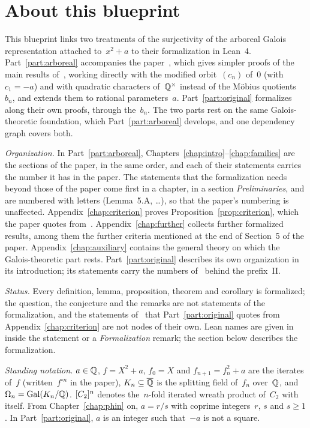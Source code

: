 \chapter*{About this blueprint}

This blueprint links two treatments of the surjectivity of the arboreal Galois representation
attached to~$x^2 + a$ to their formalization in Lean~4. Part~\ref{part:arboreal} accompanies the
paper~\cite{arboreal}, which gives simpler proofs of the main results
of~\cite{paper, li2020, li2021}, working directly with the modified orbit~$(c_n)$ of~$0$ (with
$c_1 = -a$) and with quadratic characters of~$\mathbb{Q}^\times$ instead of the Möbius quotients~$b_n$,
and extends them to rational parameters~$a$. Part~\ref{part:original} formalizes~\cite{paper, li2020, li2021} along
their own proofs, through the~$b_n$. The two parts rest on the same Galois-theoretic foundation,
which Part~\ref{part:arboreal} develops, and one dependency graph covers both.

\emph{Organization.} In Part~\ref{part:arboreal}, Chapters~\ref{chap:intro}--\ref{chap:families}
are the sections of the paper, in the same order, and each of their statements carries the number it has in the paper.
The statements that the formalization needs beyond those of the paper come first in a chapter,
in a section \emph{Preliminaries}, and are numbered with letters (Lemma~5.A, \dots), so that the
paper's numbering is unaffected. Appendix~\ref{chap:criterion} proves
Proposition~\ref{prop:criterion}, which the paper quotes from~\cite{paper}.
Appendix~\ref{chap:further} collects further formalized results, among them the further criteria
mentioned at the end of Section~5 of the paper. Appendix~\ref{chap:auxiliary} contains the
general theory on which the Galois-theoretic part rests. Part~\ref{part:original} describes its
own organization in its introduction; its statements carry the numbers of~\cite{paper} behind the
prefix~II.

\emph{Status.} Every definition, lemma, proposition, theorem and corollary is formalized; the
question, the conjecture and the remarks are not statements of the formalization, and the
statements of~\cite{paper} that Part~\ref{part:original} quotes from Appendix~\ref{chap:criterion}
are not nodes of their own. Lean names are
given in  inside the statement or a \emph{Formalization} remark; the section
below describes the formalization.

\emph{Standing notation.} $a \in \mathbb{Q}$, $f = X^2 + a$, $f_0 = X$ and $f_{n+1} = f_n^2 + a$ are
the iterates of~$f$ (written~$f^{\circ n}$ in the paper), $K_n \subseteq \overline{\mathbb{Q}}$ is the splitting
field of~$f_n$ over~$\mathbb{Q}$, and $\Omega_n = \operatorname{Gal}(K_n/\mathbb{Q})$. $[C_2]^{n}$ denotes the~$n$-fold iterated
wreath product of~$C_2$ with itself. From Chapter~\ref{chap:phin} on, $a = r/s$ with coprime
integers~$r$, $s$ and $s \ge 1$. In Part~\ref{part:original}, $a$ is an integer such that~$-a$ is
not a square.

